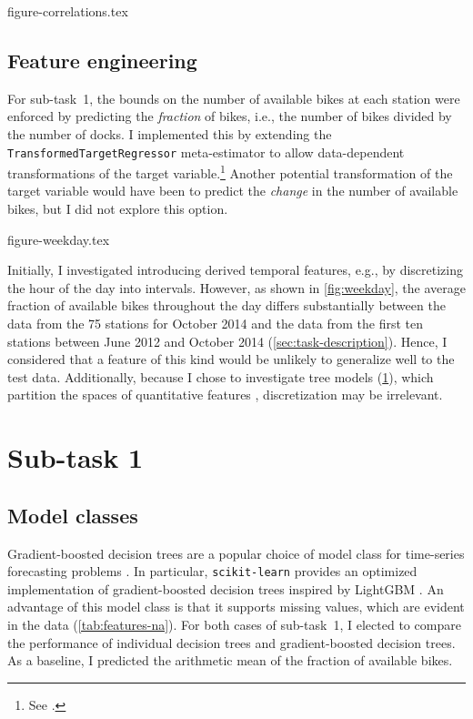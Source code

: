 \documentclass[11pt]{extarticle}
\begin{document}
{figure-correlations.tex}

\subsection{Feature engineering}
\label{sec:data-analysis:feature-engineering}

For sub-task~1, the bounds on the number of available bikes at each station were
enforced by predicting the \emph{fraction} of bikes, i.e., the number of bikes divided
by the number of docks.
I implemented this by extending the \texttt{TransformedTargetRegressor} meta-estimator
to allow data-dependent transformations of the target variable.\footnote{See
  .
}
Another potential transformation of the target variable would have been to predict the
\emph{change} in the number of available bikes, but I did not explore this option.

{figure-weekday.tex}

Initially, I investigated introducing derived temporal features, e.g., by discretizing
the hour of the day into intervals.
However, as shown in \cref{fig:weekday}, the average fraction of available bikes
throughout the day differs substantially between the data from the 75 stations for
October 2014 and the data from the first ten stations between June 2012 and October
2014 (\cref{sec:task-description}).
Hence, I considered that a feature of this kind would be unlikely to generalize well to
the test data.
Additionally, because I chose to investigate tree models (\cref{sec:st1}), which
partition the spaces of quantitative features \parencite[155]{Flach2012},
discretization may be irrelevant.

\section{Sub-task 1}
\label{sec:st1}

\subsection{Model classes}
\label{sec:st1:model-classes}

Gradient-boosted decision trees are a popular choice of model class for time-series
forecasting problems \parencite{Bojer2021}.
In particular, \texttt{scikit-learn} provides an optimized implementation of
gradient-boosted decision trees inspired by LightGBM \parencite{Ke2017}.
An advantage of this model class is that it supports missing values, which are evident
in the data (\cref{tab:features-na}).
For both cases of sub-task~1, I elected to compare the performance of individual
decision trees and gradient-boosted decision trees.
As a baseline, I predicted the arithmetic mean of the fraction of available bikes.
\end{document}
